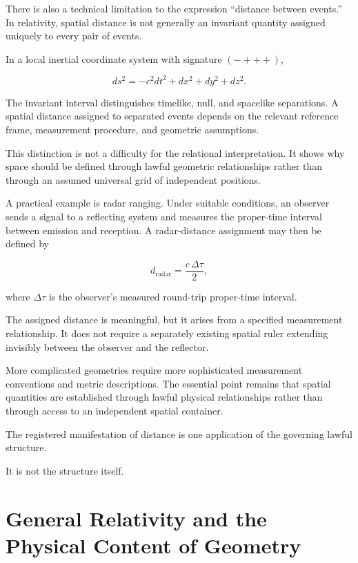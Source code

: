 \documentclass[12pt,onecolumn]{article}
\begin{document}
There is also a technical limitation to the expression ``distance between events.'' In relativity, spatial distance is not generally an invariant quantity assigned uniquely to every pair of events.

In a local inertial coordinate system with signature $(-+++)$,

\begin{equation}
ds^2=-c^2dt^2+dx^2+dy^2+dz^2.
\end{equation}

The invariant interval distinguishes timelike, null, and spacelike separations. A spatial distance assigned to separated events depends on the relevant reference frame, measurement procedure, and geometric assumptions.

This distinction is not a difficulty for the relational interpretation. It shows why space should be defined through lawful geometric relationships rather than through an assumed universal grid of independent positions.

A practical example is radar ranging. Under suitable conditions, an observer sends a signal to a reflecting system and measures the proper-time interval between emission and reception. A radar-distance assignment may then be defined by

\begin{equation}
d_{\mathrm{radar}}=\frac{c\,\Delta\tau}{2},
\end{equation}

where $\Delta\tau$ is the observer's measured round-trip proper-time interval.

The assigned distance is meaningful, but it arises from a specified measurement relationship. It does not require a separately existing spatial ruler extending invisibly between the observer and the reflector.

More complicated geometries require more sophisticated measurement conventions and metric descriptions. The essential point remains that spatial quantities are established through lawful physical relationships rather than through access to an independent spatial container.

The registered manifestation of distance is one application of the governing lawful structure.

It is not the structure itself.

\section{General Relativity and the Physical Content of Geometry}
\end{document}
